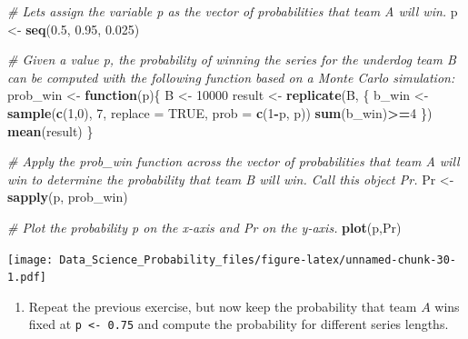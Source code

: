 \documentclass[
]{article}
\newenvironment{Shaded}{\begin{snugshade}}{\end{snugshade}}
\newcommand{\CommentTok}[1]{\textcolor[rgb]{0.56,0.35,0.01}{\textit{#1}}}
\newcommand{\ControlFlowTok}[1]{\textcolor[rgb]{0.13,0.29,0.53}{\textbf{#1}}}
\newcommand{\DataTypeTok}[1]{\textcolor[rgb]{0.13,0.29,0.53}{#1}}
\newcommand{\DecValTok}[1]{\textcolor[rgb]{0.00,0.00,0.81}{#1}}
\newcommand{\FloatTok}[1]{\textcolor[rgb]{0.00,0.00,0.81}{#1}}
\newcommand{\KeywordTok}[1]{\textcolor[rgb]{0.13,0.29,0.53}{\textbf{#1}}}
\newcommand{\NormalTok}[1]{#1}
\newcommand{\OperatorTok}[1]{\textcolor[rgb]{0.81,0.36,0.00}{\textbf{#1}}}
\newcommand{\OtherTok}[1]{\textcolor[rgb]{0.56,0.35,0.01}{#1}}
\newcommand{\StringTok}[1]{\textcolor[rgb]{0.31,0.60,0.02}{#1}}
\providecommand{\tightlist}{%
  \setlength{\itemsep}{0pt}\setlength{\parskip}{0pt}}
\begin{document}
\begin{Shaded}
\begin{Highlighting}[]
\CommentTok{\# Let\textquotesingle{}s assign the variable \textquotesingle{}p\textquotesingle{} as the vector of probabilities that team A will win.}
\NormalTok{p \textless{}{-}}\StringTok{ }\KeywordTok{seq}\NormalTok{(}\FloatTok{0.5}\NormalTok{, }\FloatTok{0.95}\NormalTok{, }\FloatTok{0.025}\NormalTok{)}

\CommentTok{\# Given a value \textquotesingle{}p\textquotesingle{}, the probability of winning the series for the underdog team B can be computed with the following function based on a Monte Carlo simulation:}
\NormalTok{prob\_win \textless{}{-}}\StringTok{ }\ControlFlowTok{function}\NormalTok{(p)\{}
\NormalTok{  B \textless{}{-}}\StringTok{ }\DecValTok{10000}
\NormalTok{  result \textless{}{-}}\StringTok{ }\KeywordTok{replicate}\NormalTok{(B, \{}
\NormalTok{    b\_win \textless{}{-}}\StringTok{ }\KeywordTok{sample}\NormalTok{(}\KeywordTok{c}\NormalTok{(}\DecValTok{1}\NormalTok{,}\DecValTok{0}\NormalTok{), }\DecValTok{7}\NormalTok{, }\DataTypeTok{replace =} \OtherTok{TRUE}\NormalTok{, }\DataTypeTok{prob =} \KeywordTok{c}\NormalTok{(}\DecValTok{1}\OperatorTok{{-}}\NormalTok{p, p))}
    \KeywordTok{sum}\NormalTok{(b\_win)}\OperatorTok{\textgreater{}=}\DecValTok{4}
\NormalTok{    \})}
  \KeywordTok{mean}\NormalTok{(result)}
\NormalTok{\}}

\CommentTok{\# Apply the \textquotesingle{}prob\_win\textquotesingle{} function across the vector of probabilities that team A will win to determine the probability that team B will win. Call this object \textquotesingle{}Pr\textquotesingle{}.}
\NormalTok{Pr \textless{}{-}}\StringTok{ }\KeywordTok{sapply}\NormalTok{(p, prob\_win)}

\CommentTok{\# Plot the probability \textquotesingle{}p\textquotesingle{} on the x{-}axis and \textquotesingle{}Pr\textquotesingle{} on the y{-}axis.}
\KeywordTok{plot}\NormalTok{(p,Pr)}
\end{Highlighting}
\end{Shaded}

\texttt{[image: Data\_Science\_Probability\_files/figure-latex/unnamed-chunk-30-1.pdf]}

\begin{enumerate}
\def\labelenumi{\arabic{enumi}.}
\setcounter{enumi}{3}
\tightlist
\item
  Repeat the previous exercise, but now keep the probability that team
  \(A\) wins fixed at \texttt{p\ \textless{}-\ 0.75} and compute the
  probability for different series lengths.
\end{enumerate}
\end{document}
